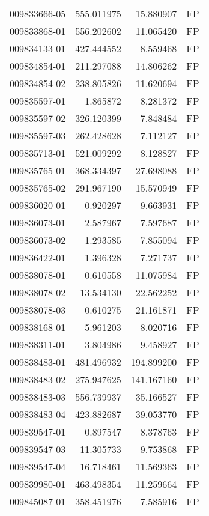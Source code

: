 \begin{tabular}{lrrl}
009833666-05 &  555.011975 &    15.880907 &   FP \\
009833868-01 &  556.202602 &    11.065420 &   FP \\
009834133-01 &  427.444552 &     8.559468 &   FP \\
009834854-01 &  211.297088 &    14.806262 &   FP \\
009834854-02 &  238.805826 &    11.620694 &   FP \\
009835597-01 &    1.865872 &     8.281372 &   FP \\
009835597-02 &  326.120399 &     7.848484 &   FP \\
009835597-03 &  262.428628 &     7.112127 &   FP \\
009835713-01 &  521.009292 &     8.128827 &   FP \\
009835765-01 &  368.334397 &    27.698088 &   FP \\
009835765-02 &  291.967190 &    15.570949 &   FP \\
009836020-01 &    0.920297 &     9.663931 &   FP \\
009836073-01 &    2.587967 &     7.597687 &   FP \\
009836073-02 &    1.293585 &     7.855094 &   FP \\
009836422-01 &    1.396328 &     7.271737 &   FP \\
009838078-01 &    0.610558 &    11.075984 &   FP \\
009838078-02 &   13.534130 &    22.562252 &   FP \\
009838078-03 &    0.610275 &    21.161871 &   FP \\
009838168-01 &    5.961203 &     8.020716 &   FP \\
009838311-01 &    3.804986 &     9.458927 &   FP \\
009838483-01 &  481.496932 &   194.899200 &   FP \\
009838483-02 &  275.947625 &   141.167160 &   FP \\
009838483-03 &  556.739937 &    35.166527 &   FP \\
009838483-04 &  423.882687 &    39.053770 &   FP \\
009839547-01 &    0.897547 &     8.378763 &   FP \\
009839547-03 &   11.305733 &     9.753868 &   FP \\
009839547-04 &   16.718461 &    11.569363 &   FP \\
009839980-01 &  463.498354 &    11.259664 &   FP \\
009845087-01 &  358.451976 &     7.585916 &   FP \\

\end{tabular}

